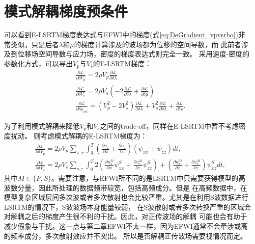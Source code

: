 \section{模式解耦梯度预条件}
可以看到E-LSRTM梯度表达式与EFWI中的梯度(式\ref{eq:DeGradient_vpvsrho})非常类似，只是后者$\lambda$和$\mu$的梯度计算涉及的波场都为位移的空间导数，而
此前者涉及到位移场空间导数与应力场，密度的梯度表达式则完全一致。
采用速度-密度的参数化方式，可以导出$V_p$与$V_s$的E-LSRTM梯度：
\begin{equation}
\begin{split}
   & \frac{\partial\mathcal{L}}{\partial \delta V_p}=2\rho V_p\frac{\partial\mathcal{L}}{\partial \delta \lambda}\\
   & \frac{\partial\mathcal{L}}{\partial \delta V_s}=2\rho V_s(-2\frac{\partial\mathcal{L}}{\partial \delta \lambda}
	+\frac{\partial\mathcal{L}}{\partial \delta \mu})\\
   & \frac{\partial\mathcal{L}}{\partial \delta\rho_{vel}}=(V^2_p-2V^2_s)\frac{\partial\mathcal{L}}{\partial \delta \lambda}+V^2_s\frac{\partial\mathcal{L}}{\partial \delta \lambda}+\frac{\partial\mathcal{L}}{\partial \delta\rho}.
    \label{eq:Gradient_VpVsrho_LSRTM}
\end{split}
\end{equation}

为了利用模式解耦来降低$V_p$和$V_s$之间的trade-off，同样在E-LSRTM中暂不考虑密度扰动。
则考虑模式解耦的E-LSRTM梯度为：
\begin{equation}
\begin{split}
   & \frac{\partial\mathcal{L}}{\partial \delta V_p}=2\rho V_p\sum_{s,r}\int^T_{0}
	(\frac{\partial u_x}{\partial x}+\frac{\partial u_z}{\partial
	z})(\psi_{xx}+\psi_{zz})dt,\\
   & \frac{\partial\mathcal{L}}{\partial \delta V_s}=2\rho V_s\sum_{s,r}\int^T_{0}
	2(\frac{\partial u^M_x}{\partial x}\psi^S_{xx}+\frac{\partial u^M_z}{\partial z}\psi^S_{zz})+
	(\frac{\partial u^M_x}{\partial z}+\frac{\partial u^M_x}{\partial
	z})\psi^S_{xz}dt,
    \label{eq:Gradient_Vel_LSRTM}
\end{split}
\end{equation}
其中$M\in{\{P,S\}}$。需要注意，与EFWI所不同的是LSRTM中只需要获得模型的高波数分量，因此所处理的数据频带较宽，包括高频成分。但是
在高频数据中，在模型复杂区域层间多次波或者多次散射也会比较严重。尤其是在利用S波数据进行LSRTM的情况下，S波波场本身能量较弱，
在S波散射或者多次转换严重的区域会对解耦之后的梯度产生很不利的干扰。因此，对正传波场的解耦
可能也会有助于减少假象与干扰。这一点与第二章EFWI不太一样，因为EFWI通常不会牵涉或高的频率成分，多次散射效应并不突出。
所以是否解耦正传波场需要视情况而定。

